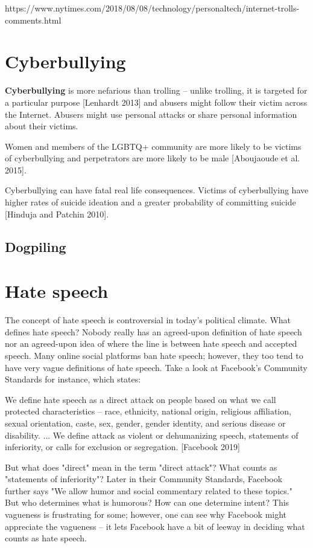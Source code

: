 \documentclass[class=book, crop=false]{standalone}
\providecommand{\keyterm}[1]{\textbf{#1}\marginnote{\scriptsize \textbf{#1}}}
\begin{document}
https://www.nytimes.com/2018/08/08/technology/personaltech/internet-trolls-comments.html


\section{Cyberbullying}

\keyterm{Cyberbullying} is more nefarious than trolling -- unlike trolling, it is targeted for a particular purpose [Lenhardt 2013] and abusers might follow their victim across the Internet. Abusers might use personal attacks or share personal information about their victims.

Women and members of the LGBTQ+ community are more likely to be victims of cyberbullying and perpetrators are more likely to be male [Aboujaoude et al. 2015].

Cyberbullying can have fatal real life consequences. Victims of cyberbullying have higher rates of suicide ideation and a greater probability of committing suicide [Hinduja and Patchin 2010].

\subsection{Dogpiling}

\section{Hate speech}

The concept of hate speech is controversial in today's political climate. What defines hate speech? Nobody really has an agreed-upon definition of hate speech nor an agreed-upon idea of where the line is between hate speech and accepted speech. Many online social platforms ban hate speech; however, they too tend to have very vague definitions of hate speech. Take a look at Facebook's Community Standards for instance, which states:

\begin{displayquote}
We define hate speech as a direct attack on people based on what we call protected characteristics -- race, ethnicity, national origin, religious affiliation, sexual orientation, caste, sex, gender, gender identity, and serious disease or disability. ... We define attack as violent or dehumanizing speech, statements of inferiority, or calls for exclusion or segregation. [Facebook 2019]
\end{displayquote}

But what does "direct" mean in the term "direct attack"? What counts as "statements of inferiority"? Later in their Community Standards, Facebook further says "We allow humor and social commentary related to these topics." But who determines what is humorous? How can one determine intent? This vagueness is frustrating for some; however, one can see why Facebook might appreciate the vagueness -- it lets Facebook have a bit of leeway in deciding what counts as hate speech.
\end{document}
